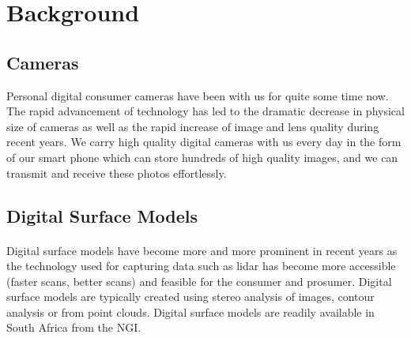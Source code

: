 

\section{Background}
\subsection{Cameras}
Personal digital consumer cameras have been with us for quite some time now. The rapid advancement of technology has led to the dramatic decrease in physical size of cameras as well as the rapid increase of image and lens quality during recent years. We carry high quality digital cameras with us every day in the form of our smart phone which can store hundreds of high quality images, and we can transmit and receive these photos effortlessly.

\subsection{Digital Surface Models}
\paragraph{}
Digital surface models have become more and more prominent in recent years as the technology used for capturing data such as lidar has become more accessible (faster scans, better scans) and feasible for the consumer and prosumer. Digital surface models are typically created using stereo analysis of images, contour analysis or from point clouds. Digital surface models are readily available in South Africa from the NGI.